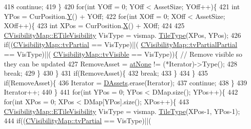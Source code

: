 \begin{DoxyCode}
418             \textcolor{keywordflow}{continue};
419         \}
420         \textcolor{keywordflow}{for}(\textcolor{keywordtype}{int} YOff = 0; YOff < AssetSize; YOff++)\{
421             \textcolor{keywordtype}{int} YPos = CurPosition.\hyperlink{classCPosition_a1aa8a30e2f08dda1f797736ba8c13a87}{Y}() + YOff;
422             \textcolor{keywordflow}{for}(\textcolor{keywordtype}{int} XOff = 0; XOff < AssetSize; XOff++)\{
423                 \textcolor{keywordtype}{int} XPos = CurPosition.\hyperlink{classCPosition_a9a6b94d3b91df1492d166d9964c865fc}{X}() + XOff;
424 
425                 \hyperlink{classCVisibilityMap_a6665f905da08825adbb0eee7bd1f2f30}{CVisibilityMap::ETileVisibility} VisType = vismap.
      \hyperlink{classCVisibilityMap_a8517fe52114dd469093fd1bd13482733}{TileType}(XPos, YPos);
426                 \textcolor{keywordflow}{if}((\hyperlink{classCVisibilityMap_a6665f905da08825adbb0eee7bd1f2f30a0037f47075e3bde5e8e32dbd55754976}{CVisibilityMap::tvPartial} == VisType)||(
      \hyperlink{classCVisibilityMap_a6665f905da08825adbb0eee7bd1f2f30a75af969b6d667b802b64bacd8bca7b63}{CVisibilityMap::tvPartialPartial} == VisType)||(
      \hyperlink{classCVisibilityMap_a6665f905da08825adbb0eee7bd1f2f30a3c881652ef7164aa086e595eef0ff5d6}{CVisibilityMap::tvVisible} == VisType))\{ \textcolor{comment}{// Remove visible so they can be updated}
427                     RemoveAsset = \hyperlink{GameDataTypes_8h_a5600d4fc433b83300308921974477feca82fb51718e2c00981a2d37bc6fe92593}{atNone} != (*Iterator)->Type();
428                     \textcolor{keywordflow}{break};
429                 \}
430             \}
431             \textcolor{keywordflow}{if}(RemoveAsset)\{
432                 \textcolor{keywordflow}{break};   
433             \}
434         \}
435         \textcolor{keywordflow}{if}(RemoveAsset)\{
436             Iterator = \hyperlink{classCAssetDecoratedMap_a94eeed5b16141169b1ba6cb3842055aa}{DAssets}.erase(Iterator);
437             \textcolor{keywordflow}{continue};
438         \}
439         Iterator++;
440     \}
441     \textcolor{keywordflow}{for}(\textcolor{keywordtype}{int} YPos = 0; YPos < DMap.size(); YPos++)\{
442         \textcolor{keywordflow}{for}(\textcolor{keywordtype}{int} XPos = 0; XPos < DMap[YPos].size(); XPos++)\{
443             \hyperlink{classCVisibilityMap_a6665f905da08825adbb0eee7bd1f2f30}{CVisibilityMap::ETileVisibility} VisType = vismap.
      \hyperlink{classCVisibilityMap_a8517fe52114dd469093fd1bd13482733}{TileType}(XPos-1, YPos-1);
444             \textcolor{keywordflow}{if}((\hyperlink{classCVisibilityMap_a6665f905da08825adbb0eee7bd1f2f30a0037f47075e3bde5e8e32dbd55754976}{CVisibilityMap::tvPartial} == VisType)||(

\end{DoxyCode}
